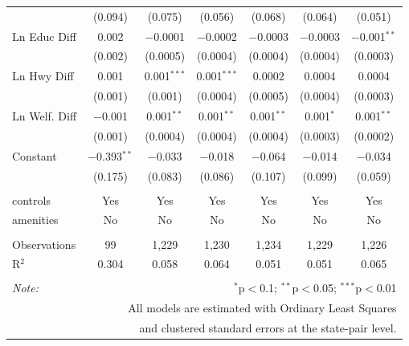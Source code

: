 \begin{table}[!htbp]
\begin{tabular}{@{\extracolsep{5pt}}lcccccc}
  & (0.094) & (0.075) & (0.056) & (0.068) & (0.064) & (0.051) \\ 
  Ln Educ Diff & 0.002 & $-$0.0001 & $-$0.0002 & $-$0.0003 & $-$0.0003 & $-$0.001$^{**}$ \\ 
  & (0.002) & (0.0005) & (0.0004) & (0.0004) & (0.0004) & (0.0003) \\ 
  Ln Hwy Diff & 0.001 & 0.001$^{***}$ & 0.001$^{***}$ & 0.0002 & 0.0004 & 0.0004 \\ 
  & (0.001) & (0.001) & (0.0004) & (0.0005) & (0.0004) & (0.0003) \\ 
  Ln Welf. Diff & $-$0.001 & 0.001$^{**}$ & 0.001$^{**}$ & 0.001$^{**}$ & 0.001$^{*}$ & 0.001$^{**}$ \\ 
  & (0.001) & (0.0004) & (0.0004) & (0.0004) & (0.0003) & (0.0002) \\ 
  Constant & $-$0.393$^{**}$ & $-$0.033 & $-$0.018 & $-$0.064 & $-$0.014 & $-$0.034 \\ 
  & (0.175) & (0.083) & (0.086) & (0.107) & (0.099) & (0.059) \\ 
 \hline \\[-1.8ex] 
controls & Yes & Yes & Yes & Yes & Yes & Yes \\ 
amenities & No & No & No & No & No & No \\ 
\hline \\[-1.8ex] 
Observations & 99 & 1,229 & 1,230 & 1,234 & 1,229 & 1,226 \\ 
R$^{2}$ & 0.304 & 0.058 & 0.064 & 0.051 & 0.051 & 0.065 \\ 
\hline 
\hline \\[-1.8ex] 
\textit{Note:}  & \multicolumn{6}{r}{$^{*}$p$<$0.1; $^{**}$p$<$0.05; $^{***}$p$<$0.01} \\ 
 & \multicolumn{6}{r}{All models are estimated with Ordinary Least Squares} \\ 
 & \multicolumn{6}{r}{and clustered standard errors at the state-pair level.} \\ 
\end{tabular} 
\end{table} 
